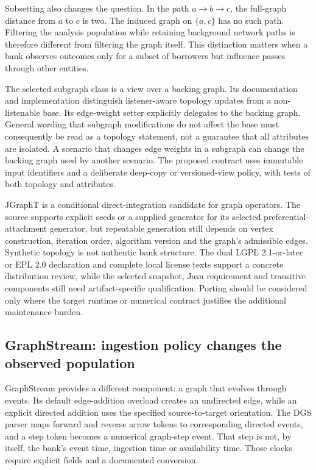 Subsetting also changes the question. In the path $a\to b\to c$, the full-graph distance from $a$ to $c$ is two. The induced graph on $\{a,c\}$ has no such path. Filtering the analysis population while retaining background network paths is therefore different from filtering the graph itself. This distinction matters when a bank observes outcomes only for a subset of borrowers but influence passes through other entities.~\citep{exec25_jnet_choice}

The selected subgraph class is a view over a backing graph. Its documentation and implementation distinguish listener-aware topology updates from a non-listenable base. Its edge-weight setter explicitly delegates to the backing graph. General wording that subgraph modifications do not affect the base must consequently be read as a topology statement, not a guarantee that all attributes are isolated. A scenario that changes edge weights in a subgraph can change the backing graph used by another scenario. The proposed contract uses immutable input identifiers and a deliberate deep-copy or versioned-view policy, with tests of both topology and attributes.~\citep{exec25_jnet_jgrapht}

JGraphT is a conditional direct-integration candidate for graph operators. The source supports explicit seeds or a supplied generator for its selected preferential-attachment generator, but repeatable generation still depends on vertex construction, iteration order, algorithm version and the graph's admissible edges. Synthetic topology is not authentic bank structure. The dual LGPL 2.1-or-later or EPL 2.0 declaration and complete local license texts support a concrete distribution review, while the selected snapshot, Java requirement and transitive components still need artifact-specific qualification. Porting should be considered only where the target runtime or numerical contract justifies the additional maintenance burden.~\citep{exec25_jnet_jgrapht,exec25_jnet_choice}

\subsection{GraphStream: ingestion policy changes the observed population}

GraphStream provides a different component: a graph that evolves through events. Its default edge-addition overload creates an undirected edge, while an explicit directed addition uses the specified source-to-target orientation. The DGS parser maps forward and reverse arrow tokens to corresponding directed events, and a step token becomes a numerical graph-step event. That step is not, by itself, the bank's event time, ingestion time or availability time. Those clocks require explicit fields and a documented conversion.~\citep{exec25_jnet_graphstream}

